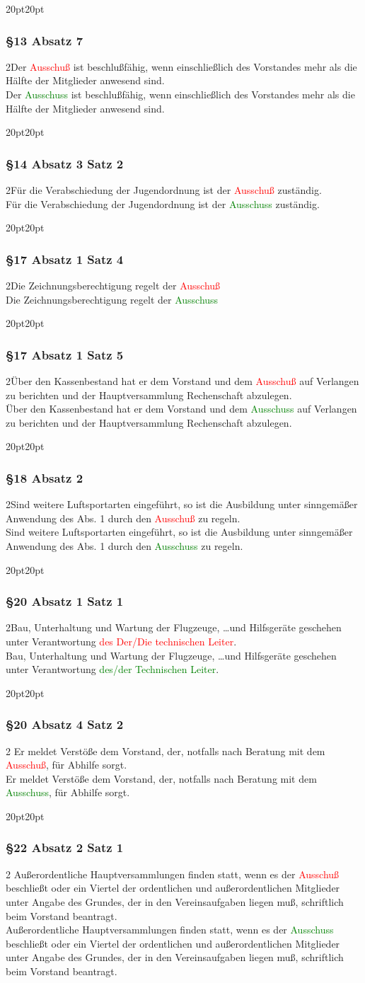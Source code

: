\documentclass[10pt,a4paper,parskip=half]{scrartcl}
\newcommand{\new}[1]{\textcolor{Green}{#1}}
\newcommand{\old}[1]{\textcolor{Red}{#1}}
\newcommand{\change}[1]{
  \begin{adjustwidth}{20pt}{20pt}
    #1
  \end{adjustwidth}
}
\newcommand{\compare}[3]{\change{\subsubsection*{#1}\begin{multicols}{2}#2\columnbreak\\#3\end{multicols}}}
\begin{document}
  \compare{§13 Absatz 7}
  {Der \old{Ausschuß} ist beschlußfähig, wenn einschließlich des Vorstandes mehr als die Hälfte der Mitglieder anwesend sind.}
  {Der \new{Ausschuss} ist beschlußfähig, wenn einschließlich des Vorstandes mehr als die Hälfte der Mitglieder anwesend sind.}

  \compare{§14 Absatz 3 Satz 2}
  {Für die Verabschiedung der Jugendordnung ist der \old{Ausschuß} zuständig.}
  {Für die Verabschiedung der Jugendordnung ist der \new{Ausschuss} zuständig.}
    
  \compare{§17 Absatz 1 Satz 4}{Die Zeichnungsberechtigung regelt der \old{Ausschuß}}{Die Zeichnungsberechtigung regelt der \new{Ausschuss}}
  \compare{§17 Absatz 1 Satz 5}{Über den Kassenbestand hat er dem Vorstand und dem \old{Ausschuß} auf Verlangen zu berichten und der Hauptversammlung Rechenschaft abzulegen.}{Über den Kassenbestand hat er dem Vorstand und dem \new{Ausschuss} auf Verlangen zu berichten und der Hauptversammlung Rechenschaft abzulegen.}

  \compare{§18 Absatz 2}{Sind weitere Luftsportarten eingeführt, so ist die Ausbildung unter sinngemäßer Anwendung des
  Abs. 1 durch den \old{Ausschuß} zu regeln.}{Sind weitere Luftsportarten eingeführt, so ist die Ausbildung unter sinngemäßer Anwendung des
  Abs. 1 durch den \new{Ausschuss} zu regeln.}

  \compare{§20 Absatz 1 Satz 1}
  {Bau, Unterhaltung und Wartung der Flugzeuge, \dots und Hilfsgeräte geschehen unter Verantwortung \old{des Der/Die technischen Leiter}.}
  {Bau, Unterhaltung und Wartung der Flugzeuge, \dots und Hilfsgeräte geschehen unter Verantwortung \new{des/der Technischen Leiter}.}
  
  \compare{§20 Absatz 4 Satz 2}{
    Er meldet Verstöße dem Vorstand, der, notfalls nach Beratung mit dem \old{Ausschuß}, für Abhilfe sorgt.
  }{
    Er meldet Verstöße dem Vorstand, der, notfalls nach Beratung mit dem \new{Ausschuss}, für Abhilfe sorgt.
  }

  \clearpage
  \compare{§22 Absatz 2 Satz 1}
   {
    Außerordentliche Hauptversammlungen finden statt,
    wenn es der \old{Ausschuß} beschließt oder ein Viertel der ordentlichen und außerordentlichen Mitglieder unter Angabe des Grundes,
    der in den Vereinsaufgaben liegen muß,
    schriftlich beim Vorstand beantragt.
    }
   {
    Außerordentliche Hauptversammlungen finden statt,
    wenn es der \new{Ausschuss} beschließt oder ein Viertel der ordentlichen und außerordentlichen Mitglieder unter Angabe des Grundes,
    der in den Vereinsaufgaben liegen muß,
    schriftlich beim Vorstand beantragt.
    }
\end{document}
